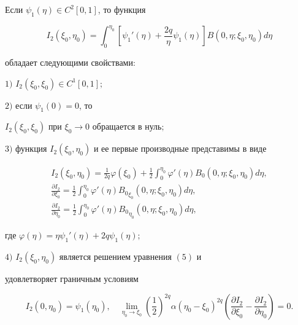 \begin{lem}


Если $\psi_1 (\eta)\in C^2[0,1]$, то функция


\begin{equation}


I_2(\xi_0,\eta_0)=\int_0^{\eta_0} \left[ \psi_1 '(\eta)+\frac{2q}{\eta}


\psi_1 (\eta)\right] B(0,\eta;\xi_0,\eta_0) d\eta


\end{equation}


обладает следующими свойствами${:}$





$1)$ $I_2(\xi_0,\xi_0)\in C^1[0,1];$





$2)$ если $\psi_1 (0)=0$, то


$I_2(\xi_0,\xi_0)$ при $\xi_0\to 0$ обращается в нуль$;$





$3)$ функция $I_2(\xi_0,\eta_0)$ и ее первые производные представимы в виде


\begin{gather}


I_2(\xi_0,\eta_0)= \frac{1}{2q}\varphi(\xi_0)+\frac{1}{2}\int_0^{\eta_0}


\varphi'(\eta) B_0(0,\eta;\xi_0,\eta_0) d\eta, \\


%


\frac{\partial I_2}{\partial \xi_0 }= \frac{1}{2}\int_0^{\eta_0}


\varphi'(\eta) {B_0}_{\xi_0}(0,\eta;\xi_0,\eta_0) d\eta,\\


%


\frac{\partial I_2}{\partial \eta_0 }= \frac{1}{2}\int_0^{\eta_0}


\varphi'(\eta) {B_0}_{\eta_0}(0,\eta;\xi_0,\eta_0) d\eta,


\end{gather}


где $\varphi(\eta)=\eta \psi_1 '(\eta)+2q\psi_1 (\eta);$





$4)$ $I_2(\xi_0,\eta_0)$ является решением уравнения $(5)$ и 


удовлетворяет граничным условиям


\begin{equation}


I_2(0,\eta_0)=\psi_1 (\eta_0),\quad \lim_{\eta_0\to \xi_0} 


\left(\frac{1}{2}\right)^{2q}\alpha


(\eta_0-\xi_0)^{2q} \left(\frac{\partial I_2}{\partial \xi_0 } -


\frac{\partial I_2}{\partial \eta_0 }\right) = 0.


\end{equation}


\end{lem}





